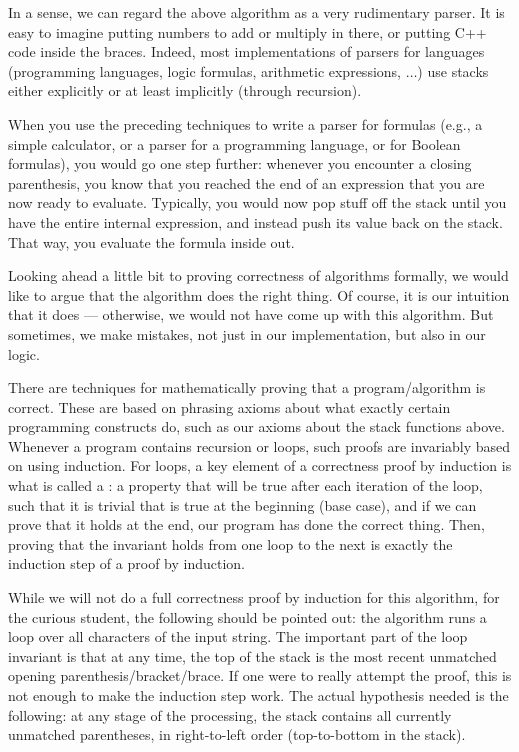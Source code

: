 In a sense, we can regard the above algorithm as a very rudimentary
parser. It is easy to imagine putting numbers to add or multiply in
there, or putting C++ code inside the braces.
Indeed, most implementations of parsers for languages (programming
languages, logic formulas, arithmetic expressions, $\ldots$) use
stacks either explicitly or at least implicitly (through recursion).

When you use the preceding techniques to write a parser for formulas
(e.g., a simple calculator, or a parser for a programming language, or
for Boolean formulas), you would go one step further: whenever you
encounter a closing parenthesis, you know that you reached the end of
an expression that you are now ready to evaluate. Typically, you would
now pop stuff off the stack until you have the entire internal
expression, and instead push its value back on the stack. That way,
you evaluate the formula inside out.

Looking ahead a little bit to proving correctness of algorithms
formally, we would like to argue that the algorithm does the right
thing. Of course, it is our intuition that it does --- otherwise, we
would not have come up with this algorithm. But sometimes, we make
mistakes, not just in our implementation, but also in our logic.

There are techniques for mathematically proving that a
program/algorithm is correct.
These are based on phrasing axioms about what exactly certain
programming constructs do, such as our axioms about the stack
functions above.
Whenever a program contains recursion or loops, such proofs are
invariably based on using induction.
For loops, a key element of a correctness proof by induction is what is
called a : a property that will be true after
each iteration of the loop, such that it is trivial that is true at the
beginning (base case), and if we can prove that it holds at the end,
our program has done the correct thing.
Then, proving that the invariant holds from one loop to the next is
exactly the induction step of a proof by induction. 

While we will not do a full correctness proof by induction for this
algorithm, for the curious student, the following should be pointed out:
the algorithm runs a loop over all characters of the input string.
The important part of the loop invariant is that at any time, the top
of the stack is the most recent unmatched opening parenthesis/bracket/brace.
If one were to really attempt the proof,
this is not enough to make the induction step work.
The actual hypothesis needed is the following: at any stage of the
processing, the stack contains all currently unmatched parentheses, in
right-to-left order (top-to-bottom in the stack).

